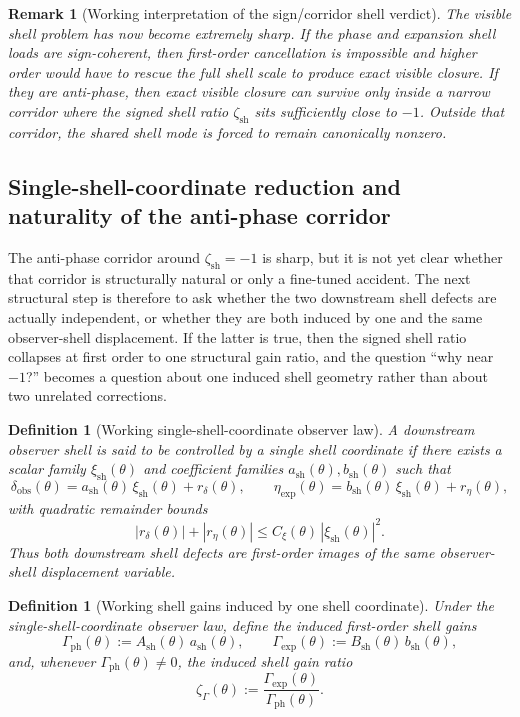 \documentclass[12pt,a4paper]{article}
\newtheorem{definition}[theorem]{Definition}
\newtheorem{remark}[theorem]{Remark}
\begin{document}
\begin{remark}[Working interpretation of the sign/corridor shell verdict]
The visible shell problem has now become extremely sharp. If the phase and expansion shell loads are sign-coherent, then first-order cancellation is impossible and higher order would have to rescue the full shell scale to produce exact visible closure. If they are anti-phase, then exact visible closure can survive only inside a narrow corridor where the signed shell ratio $\zeta_{\mathrm{sh}}$ sits sufficiently close to $-1$. Outside that corridor, the shared shell mode is forced to remain canonically nonzero.
\end{remark}



\subsection*{Single-shell-coordinate reduction and naturality of the anti-phase corridor}
The anti-phase corridor around $\zeta_{\mathrm{sh}}=-1$ is sharp, but it is not yet clear whether that corridor is structurally natural or only a fine-tuned accident. The next structural step is therefore to ask whether the two downstream shell defects are actually independent, or whether they are both induced by one and the same observer-shell displacement. If the latter is true, then the signed shell ratio collapses at first order to one structural gain ratio, and the question ``why near $-1$?'' becomes a question about one induced shell geometry rather than about two unrelated corrections.

\begin{definition}[Working single-shell-coordinate observer law]
A downstream observer shell is said to be controlled by a \emph{single shell coordinate} if there exists a scalar family $\xi_{\mathrm{sh}}(\theta)$ and coefficient families $a_{\mathrm{sh}}(\theta), b_{\mathrm{sh}}(\theta)$ such that
\[
 \delta_{\mathrm{obs}}(\theta)
 =a_{\mathrm{sh}}(\theta)\,\xi_{\mathrm{sh}}(\theta)+r_{\delta}(\theta),
 \qquad
 \eta_{\mathrm{exp}}(\theta)
 =b_{\mathrm{sh}}(\theta)\,\xi_{\mathrm{sh}}(\theta)+r_{\eta}(\theta),
\]
with quadratic remainder bounds
\[
 |r_{\delta}(\theta)|+|r_{\eta}(\theta)|
 \le C_{\xi}(\theta)\,|\xi_{\mathrm{sh}}(\theta)|^2.
\]
Thus both downstream shell defects are first-order images of the same observer-shell displacement variable.
\end{definition}

\begin{definition}[Working shell gains induced by one shell coordinate]
Under the single-shell-coordinate observer law, define the induced first-order shell gains
\[
 \Gamma_{\mathrm{ph}}(\theta):=A_{\mathrm{sh}}(\theta)\,a_{\mathrm{sh}}(\theta),
 \qquad
 \Gamma_{\mathrm{exp}}(\theta):=B_{\mathrm{sh}}(\theta)\,b_{\mathrm{sh}}(\theta),
\]
and, whenever $\Gamma_{\mathrm{ph}}(\theta)\neq 0$, the induced shell gain ratio
\[
 \zeta_{\Gamma}(\theta):=\frac{\Gamma_{\mathrm{exp}}(\theta)}{\Gamma_{\mathrm{ph}}(\theta)}.
\]
\end{definition}
\end{document}
